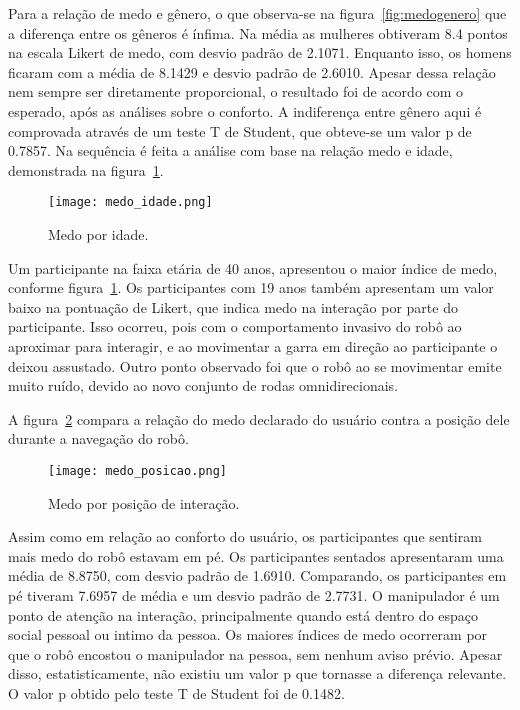 Para a relação de medo e gênero, o que observa-se na figura~\ref{fig:medogenero} que a diferença entre os gêneros é ínfima. Na média as mulheres obtiveram 8.4 pontos na escala Likert de medo, com desvio padrão de 2.1071. Enquanto isso, os homens ficaram com a média de 8.1429 e desvio padrão de 2.6010. Apesar dessa relação nem sempre ser diretamente proporcional, o resultado foi de acordo com o esperado, após as análises sobre o conforto. A indiferença entre gênero aqui é comprovada através de um teste T de Student, que obteve-se um valor p de 0.7857. Na sequência é feita a análise com base na relação medo e idade, demonstrada na figura~\ref{fig:medoidade}.

\begin{figure}[ht!]
	\centering
	\begin{minipage}{0.65\textwidth}
		\caption{Medo por idade.}
		\texttt{[image: medo\_idade.png]}
		\label{fig:medoidade}
	\end{minipage}
\end{figure}

Um participante na faixa etária de 40 anos, apresentou o maior índice de medo, conforme figura~\ref{fig:medoidade}. Os participantes com 19 anos também apresentam um valor baixo na pontuação de Likert, que indica medo na interação por parte do participante. Isso ocorreu, pois com o comportamento invasivo do robô ao aproximar para interagir, e ao movimentar a garra em direção ao participante o deixou assustado. Outro ponto observado foi que o robô ao se movimentar emite muito ruído, devido ao novo conjunto de rodas omnidirecionais.

A figura~\ref{fig:medoposicao} compara a relação do medo declarado do usuário contra a posição dele durante a navegação do robô.

\begin{figure}[ht!]
	\centering
	\begin{minipage}{0.65\textwidth}
		\caption{Medo por posição de interação.}
		\texttt{[image: medo\_posicao.png]}
		\label{fig:medoposicao}
	\end{minipage}
\end{figure}

Assim como em relação ao conforto do usuário, os participantes que sentiram mais medo do robô estavam em pé. Os participantes sentados apresentaram uma média de 8.8750, com desvio padrão de 1.6910. Comparando, os participantes em pé tiveram 7.6957 de média e um desvio padrão de 2.7731. O manipulador é um ponto de atenção na interação, principalmente quando está dentro do espaço social pessoal ou intimo da pessoa. Os maiores índices de medo ocorreram por que o robô encostou o manipulador na pessoa, sem nenhum aviso prévio. Apesar disso, estatisticamente, não existiu um valor p que tornasse a diferença relevante. O valor p obtido pelo teste T de Student foi de 0.1482. 

